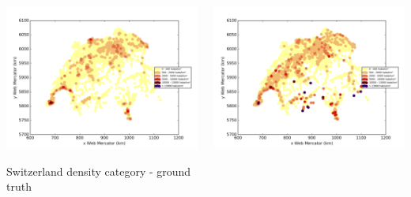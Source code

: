 \documentclass[c]{beamer}
\begin{document}
\begin{frame}
\begin{columns}
 \begin{column}{0.5\textwidth}
  \begin{overlayarea}{\linewidth}{4cm}
    \centering\vfill
    \includegraphics[scale=0.50]{images/Switzerland/density_ground_truth.png}
  \end{overlayarea}
  \begin{overlayarea}{\linewidth}{0.5cm}
    \centering
    \tiny Switzerland density category - ground truth\par
  \end{overlayarea}
 \end{column}
 \begin{column}{0.5\textwidth}
  \begin{overlayarea}{\linewidth}{4cm}
    \centering\vfill
    \includegraphics[scale=0.50]{images/Switzerland/knn/density_classification.png}

\end{overlayarea}
\end{column}
\end{columns}
\end{frame}
\end{document}
